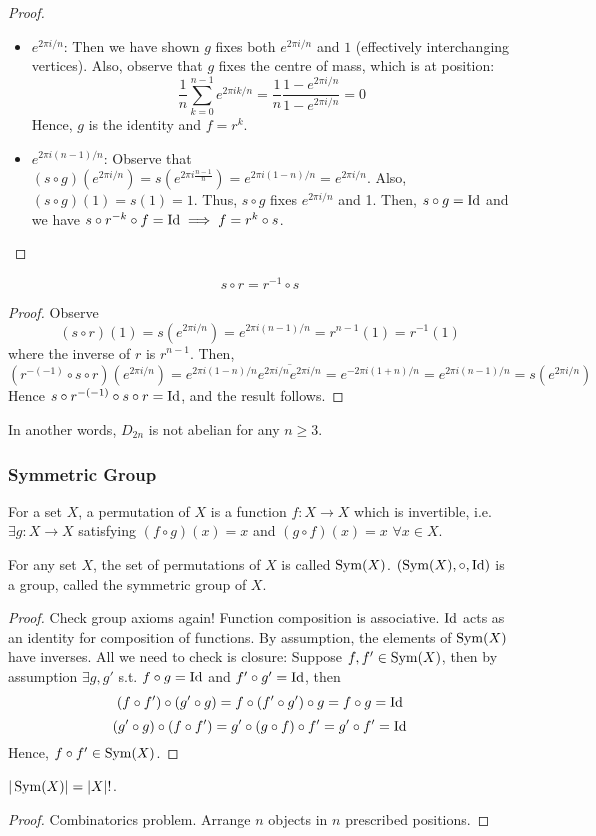 \documentclass[a4paper]{article}
\begin{document}
\begin{proof}
\begin{itemize}
    \item $e^{2\pi i/n}$: Then we have shown $g$ fixes both $e^{2\pi i/n}$ and $1$ (effectively interchanging vertices). Also, observe that $g$ fixes the centre of mass, which is at position:
    $$\frac{1}{n}\sum_{k=0}^{n-1}e^{2\pi ik/n}=\frac{1}{n}\frac{1-e^{2\pi i/n}}{1-e^{2\pi i/n}}=0$$
    Hence, $g$ is the identity and $f=r^k$.
    \item $e^{2\pi i(n-1)/n}$: Observe that $(s\circ g)(e^{2\pi i/n})=s(e^{2\pi i\frac{n-1}{n}})=e^{2\pi i(1-n)/n}=e^{2\pi i/n}$. Also, $(s\circ g)(1)=s(1)=1$. Thus, $s\circ g$ fixes $e^{2\pi i/n}$ and 1. Then, $s\circ g=\operatorname{Id}$ and we have $s\circ r^{-k}\circ f=\operatorname{Id}\implies f=r^k\circ s$.
\end{itemize}
\end{proof}
\newpage
\begin{cor}
$$s\circ r=r^{-1}\circ s$$
\end{cor}
\begin{proof}
Observe
$$(s\circ r)(1)=s(e^{2\pi i/n})=e^{2\pi i(n-1)/n}=r^{n-1}(1)=r^{-1}(1)$$
where the inverse of $r$ is $r^{n-1}$. Then,
$$(r^{-(-1)}\circ s\circ r)(e^{2\pi i/n})=e^{2\pi i(1-n)/n}\overline{e^{2\pi i/n}e^{2\pi i/n}}=e^{-2\pi i(1+n)/n}=e^{2\pi i(n-1)/n}=s(e^{2\pi i/n})$$
Hence $s\circ r^{-(-1)}\circ s\circ r=\operatorname{Id}$, and the result follows.
\end{proof}
In another words, $D_{2n}$ is not abelian for any $n\geq 3$.
\subsubsection*{Symmetric Group}
\begin{defi}[Permutation]
For a set $X$, a permutation of $X$ is a function $f:X\rightarrow X$ which is invertible, i.e. $\exists g:X\rightarrow X$ satisfying $(f\circ g)(x)=x$ and $(g\circ f)(x)=x$ $\forall x\in X$.
\end{defi}
\begin{thm}
For any set $X$, the set of permutations of $X$ is called $\operatorname{Sym}(X)$.  $(\operatorname{Sym}(X),\circ,\operatorname{Id})$ is a group, called the symmetric group of $X$.
\end{thm}
\begin{proof}
Check group axioms again! Function composition is associative. $\operatorname{Id}$ acts as an identity for composition of functions. By assumption, the elements of $\operatorname{Sym}(X)$ have inverses. All we need to check is closure: Suppose $f,f'\in\operatorname{Sym}(X)$, then by assumption $\exists g,g'$ s.t. $f\circ g=\operatorname{Id}$ and $f'\circ g'=\operatorname{Id}$, then
$$(f\circ f')\circ(g'\circ g)=f\circ(f'\circ g')\circ g=f\circ g=\operatorname{Id}$$
$$(g'\circ g)\circ(f\circ f')=g'\circ(g\circ f)\circ f'=g'\circ f'=\operatorname{Id}$$
Hence, $f\circ f'\in\operatorname{Sym}(X)$.
\end{proof}
\begin{prop}
$|\operatorname{Sym}(X)|=|X|!$.
\end{prop}
\begin{proof}
Combinatorics problem. Arrange $n$ objects in $n$ prescribed positions.
\end{proof}
\end{document}
